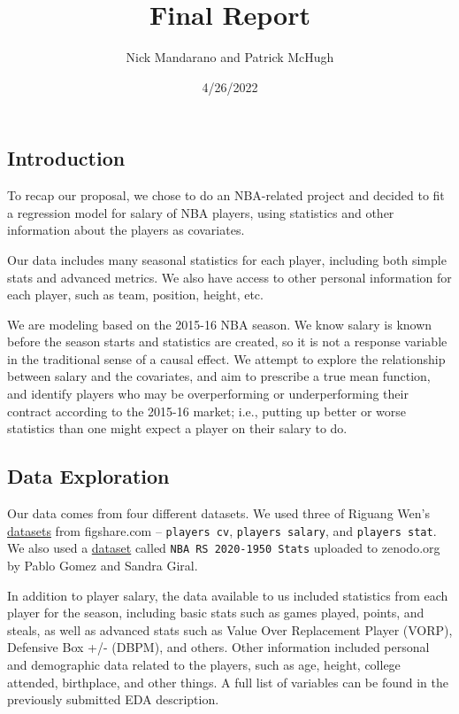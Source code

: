 \documentclass[]{article}
\title{Final Report}
\author{Nick Mandarano and Patrick McHugh}
\date{4/26/2022}
\begin{document}
\maketitle

\subsection{Introduction}\label{introduction}

To recap our proposal, we chose to do an NBA-related project and decided
to fit a regression model for salary of NBA players, using statistics
and other information about the players as covariates.

Our data includes many seasonal statistics for each player, including
both simple stats and advanced metrics. We also have access to other
personal information for each player, such as team, position, height,
etc.

We are modeling based on the 2015-16 NBA season. We know salary is known
before the season starts and statistics are created, so it is not a
response variable in the traditional sense of a causal effect. We
attempt to explore the relationship between salary and the covariates,
and aim to prescribe a true mean function, and identify players who may
be overperforming or underperforming their contract according to the
2015-16 market; i.e., putting up better or worse statistics than one
might expect a player on their salary to do.

\subsection{Data Exploration}\label{data-exploration}

Our data comes from four different datasets. We used three of Riguang
Wen's
\href{https://figshare.com/articles/dataset/NBA_data/5414170}{datasets}
from figshare.com -- \texttt{players cv}, \texttt{players salary}, and
\texttt{players stat}. We also used a
\href{https://zenodo.org/record/3750329\#.YkT6YW7MJAe}{dataset} called
\texttt{NBA RS 2020-1950 Stats} uploaded to zenodo.org by Pablo Gomez
and Sandra Giral.

In addition to player salary, the data available to us included
statistics from each player for the season, including basic stats such
as games played, points, and steals, as well as advanced stats such as
Value Over Replacement Player (VORP), Defensive Box +/- (DBPM), and
others. Other information included personal and demographic data related
to the players, such as age, height, college attended, birthplace, and
other things. A full list of variables can be found in the previously
submitted EDA description.
\end{document}
